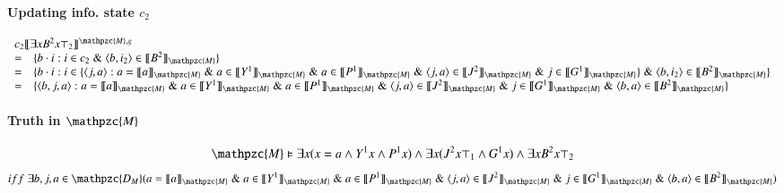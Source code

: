 \documentclass{article}
\newcommand{\im}{\rrbracket_{\mathpzc{M}}}
\begin{document}
\paragraph{Updating info. state $c_2$}
\[\begin{array}{ll}
\multicolumn{2}{l}{c_2\llbracket \exists x B^2x\top_2\rrbracket^{\mathpzc{M},g}} \\
= & \{b\cdot i: i\in c_2 \;\&\; \langle b,i_2\rangle\in \llbracket B^2\im\} \\
= & \{b\cdot i:  i\in\{\langle j, a\rangle :a=\llbracket a\im \;\&\; a\in\llbracket Y^1\im \;\&\; 
   a\in\llbracket P^1\im \;\&\;\langle j,a\rangle\in\llbracket J^2\im\;\&\; j\in\llbracket G^1\im\} \;\&\;
   \langle b,i_2\rangle\in \llbracket B^2\im\} \\
= & \{\langle b,j,a\rangle:  a=\llbracket a\im \;\&\; a\in\llbracket Y^1\im \;\&\; 
   a\in\llbracket P^1\im \;\&\;\langle j,a\rangle\in\llbracket J^2\im\;\&\; j\in\llbracket G^1\im \;\&\;
   \langle b,a\rangle\in \llbracket B^2\im\} \\
  \end{array}\]

\paragraph{Truth in $\mathpzc{M}$}

\[\mathpzc{M}\vDash \exists x (x=a \wedge Y^1x \wedge P^1x)\wedge\exists x (J^2x\top_1 \wedge G^1x)\wedge\exists x B^2x\top_2\]
\[iff\; \exists b,j,a\in\mathpzc{D_M}( a=\llbracket a\im \;\&\; a\in\llbracket Y^1\im \;\&\; 
   a\in\llbracket P^1\im \;\&\;\langle j,a\rangle\in\llbracket J^2\im\;\&\; j\in\llbracket G^1\im \;\&\;
   \langle b,a\rangle\in \llbracket B^2\im)\]
\end{document}

